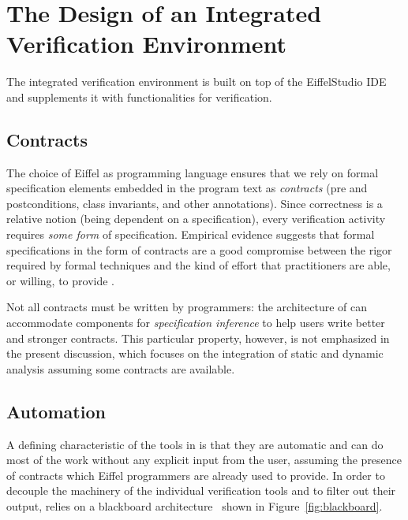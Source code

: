 
\section{The Design of an Integrated Verification Environment}\label{sec:va:general-mechanisms}

The \EVE integrated verification environment is built on top of the EiffelStudio IDE and supplements it with functionalities for verification.

\subsection{Contracts}

The choice of Eiffel as programming language ensures that we rely on formal specification elements embedded in the program text as \emph{contracts} (pre and postconditions, class invariants, and other annotations).
Since correctness is a relative notion (being dependent on a specification), every verification activity requires \emph{some form} of specification.
Empirical evidence suggests that formal specifications in the form of contracts are a good compromise between the rigor required by formal techniques and the kind of effort that practitioners are able, or willing, to provide \cite{CHALIN06,POLIKARPOVA09}.

Not all contracts must be written by programmers: the architecture of \EVE can accommodate components for \emph{specification inference} to help users write better and stronger contracts.
This particular property, however, is not emphasized in the present discussion, which focuses on the integration of static and dynamic analysis assuming some contracts are available.

\subsection{Automation}

A defining characteristic of the tools in \EVE is that they are automatic and can do most of the work without any explicit input from the user, assuming the presence of contracts which Eiffel  programmers are already used to provide.
In order to decouple the machinery of the individual verification tools and to filter out their output, \EVE relies on a blackboard architecture~\cite{HUNT02} shown in Figure~\ref{fig:blackboard}.

